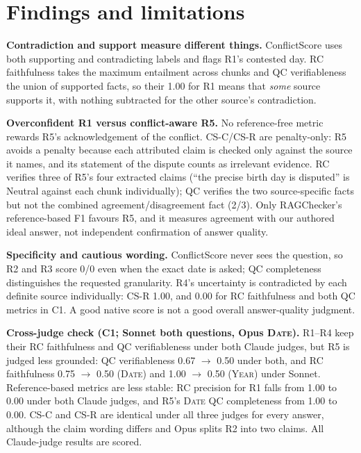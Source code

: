 \documentclass[11pt,a4paper]{article}
\begin{document}
\section{Findings and limitations}
\textbf{Contradiction and support measure different things.}
ConflictScore uses both supporting and contradicting labels and flags R1's contested day.
RC faithfulness takes the maximum entailment across chunks and QC verifiableness the union of
supported facts, so their 1.00 for R1 means that \emph{some} source supports it, with nothing
subtracted for the other source's contradiction.

\textbf{Overconfident R1 versus conflict-aware R5.}
No reference-free metric rewards R5's acknowledgement of the conflict. CS-C/CS-R are penalty-only:
R5 avoids a penalty because each attributed claim is checked only against the source it names,
and its statement of the dispute counts as irrelevant evidence. RC verifies three of R5's four
extracted claims (``the precise birth day is disputed'' is Neutral against each chunk individually);
QC verifies the two source-specific facts but not the combined agreement/disagreement fact (2/3).
Only RAGChecker's reference-based F1 favours R5, and it measures agreement with our authored
ideal answer, not independent confirmation of answer quality.

\textbf{Specificity and cautious wording.}
ConflictScore never sees the question, so R2 and R3 score 0/0 even when the exact date is asked;
QC completeness distinguishes the requested granularity. R4's uncertainty is contradicted by each
definite source individually: CS-R 1.00, and 0.00 for RC faithfulness and both QC metrics in C1.
A good native score is not a good overall answer-quality judgment.

\textbf{Cross-judge check (C1; Sonnet both questions, Opus \textsc{Date}).} R1--R4 keep their RC
faithfulness and QC verifiableness under both Claude judges, but R5 is judged less grounded: QC
verifiableness 0.67 $\to$ 0.50 under both, and RC faithfulness 0.75 $\to$ 0.50 (\textsc{Date}) and
1.00 $\to$ 0.50 (\textsc{Year}) under Sonnet. Reference-based metrics are less stable: RC precision for R1 falls from 1.00 to 0.00
under both Claude judges, and R5's \textsc{Date} QC completeness from 1.00 to 0.00.
CS-C and CS-R are identical under all three judges for every answer, although the claim wording
differs and Opus splits R2 into two claims. All Claude-judge results are scored.
\end{document}
